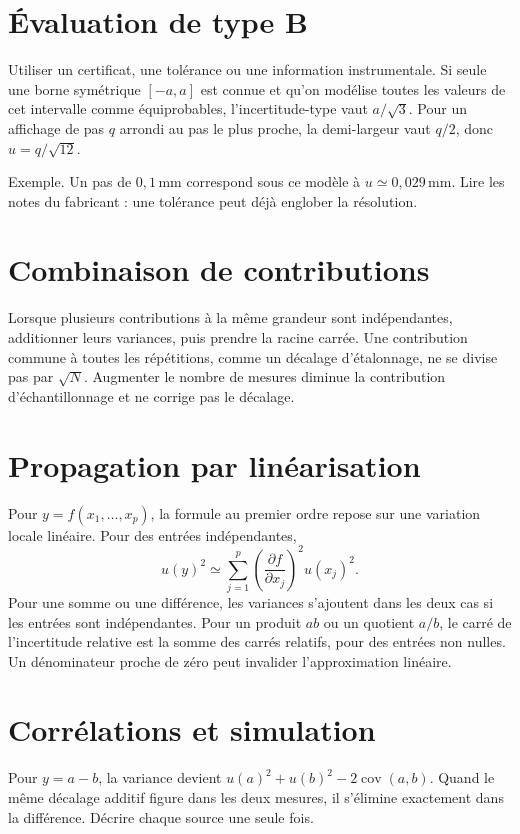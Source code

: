 \documentclass[11pt,a4paper]{article}
\begin{document}
\section*{Évaluation de type B}
Utiliser un certificat, une tolérance ou une information instrumentale. Si seule une borne symétrique $[-a,a]$ est connue et qu’on modélise toutes les valeurs de cet intervalle comme équiprobables, l’incertitude-type vaut $a/\sqrt3$. Pour un affichage de pas $q$ arrondi au pas le plus proche, la demi-largeur vaut $q/2$, donc $u=q/\sqrt{12}$.

Exemple. Un pas de $0{,}1\,\mathrm{mm}$ correspond sous ce modèle à $u\simeq0{,}029\,\mathrm{mm}$. Lire les notes du fabricant : une tolérance peut déjà englober la résolution.

\section*{Combinaison de contributions}
Lorsque plusieurs contributions à la même grandeur sont indépendantes, additionner leurs variances, puis prendre la racine carrée. Une contribution commune à toutes les répétitions, comme un décalage d’étalonnage, ne se divise pas par $\sqrt N$. Augmenter le nombre de mesures diminue la contribution d’échantillonnage et ne corrige pas le décalage.

\section*{Propagation par linéarisation}
Pour $y=f(x_1,\ldots,x_p)$, la formule au premier ordre repose sur une variation locale linéaire. Pour des entrées indépendantes,
\[ u(y)^2\simeq\sum_{j=1}^{p}\left(\frac{\partial f}{\partial x_j}\right)^2 u(x_j)^2. \]
Pour une somme ou une différence, les variances s’ajoutent dans les deux cas si les entrées sont indépendantes. Pour un produit $ab$ ou un quotient $a/b$, le carré de l’incertitude relative est la somme des carrés relatifs, pour des entrées non nulles. Un dénominateur proche de zéro peut invalider l’approximation linéaire.

\section*{Corrélations et simulation}
Pour $y=a-b$, la variance devient $u(a)^2+u(b)^2-2\operatorname{cov}(a,b)$. Quand le même décalage additif figure dans les deux mesures, il s’élimine exactement dans la différence. Décrire chaque source une seule fois.
\end{document}
